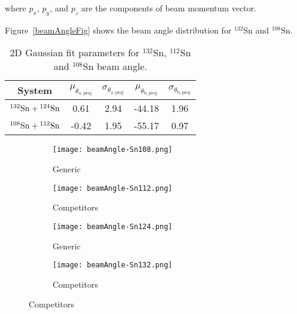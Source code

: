 where $p_x$, $p_y$, and $p_z$ are the components of beam momentum vector.

Figure~\ref{beamAngleFig} shows the beam angle distribution for ${}^{132}$Sn and ${}^{108}$Sn. 


\begin{table}[H]
  \begin{center}
    \begin{tabular}{ccccc}
      \hline 
      System & $\mu_{\theta_\mathrm{a,proj}}$ &
      $\sigma_{\theta_\mathrm{a,proj}}$ & $\mu_{\theta_\mathrm{b,proj}}$ &
      $\sigma_{\theta_\mathrm{b,proj}}$ \\
      \hline\hline 
      ${}^{132}\mathrm{Sn} + {}^{124}\mathrm{Sn}$ & 0.61 & 2.94 & -44.18 & 1.96 \\
      ${}^{108}\mathrm{Sn} + {}^{112}\mathrm{Sn}$ & -0.42 & 1.95 & -55.17 & 0.97 \\
      \hline
    \end{tabular}
    \caption{2D Gaussian fit parameters for $^{132}$Sn, $^{112}$Sn and
      $^{108}$Sn beam angle. \label{beamAngleParameters}}
  \end{center}
\end{table}

\begin{figure}[!htb]
    \centering
    \begin{subfigure}[t]{0.45\textwidth}
        \centering
        \texttt{[image: beamAngle-Sn108.png]} 
        \caption{Generic} \label{fig:beamangle108}
    \end{subfigure}
    \hfill
    \begin{subfigure}[t]{0.45\textwidth}
        \centering
        \texttt{[image: beamAngle-Sn112.png]} 
        \caption{Competitors} \label{fig:beamangle112}
    \end{subfigure}
    
    \begin{subfigure}[t]{0.45\textwidth}
        \centering
        \texttt{[image: beamAngle-Sn124.png]} 
        \caption{Generic} \label{fig:beamangle124}
    \end{subfigure}
    \hfill
    \begin{subfigure}[t]{0.45\textwidth}
        \centering
        \texttt{[image: beamAngle-Sn132.png]} 
        \caption{Competitors} \label{fig:beamangle132}
    \end{subfigure}
\label{fig:beamangle}
\end{figure}




